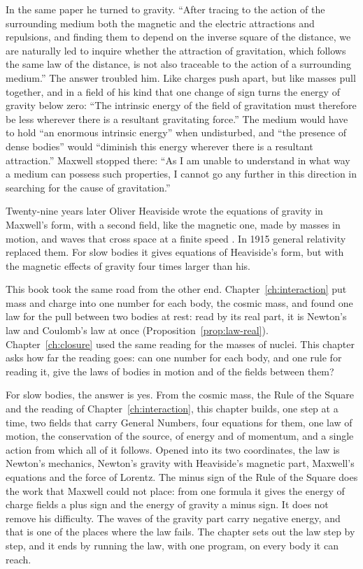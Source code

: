 In the same paper he turned to gravity. \enquote{After tracing to the action of the surrounding medium both the magnetic and the electric attractions and repulsions, and finding them to depend on the inverse square of the distance, we are naturally led to inquire whether the attraction of gravitation, which follows the same law of the distance, is not also traceable to the action of a surrounding medium.} The answer troubled him. Like charges push apart, but like masses pull together, and in a field of his kind that one change of sign turns the energy of gravity below zero: \enquote{The intrinsic energy of the field of gravitation must therefore be less wherever there is a resultant gravitating force.} The medium would have to hold \enquote{an enormous intrinsic energy} when undisturbed, and \enquote{the presence of dense bodies} would \enquote{diminish this energy wherever there is a resultant attraction.} Maxwell stopped there: \enquote{As I am unable to understand in what way a medium can possess such properties, I cannot go any further in this direction in searching for the cause of gravitation.}

Twenty-nine years later Oliver Heaviside wrote the equations of gravity in Maxwell's form, with a second field, like the magnetic one, made by masses in motion, and waves that cross space at a finite speed \citep{Heaviside1893}. In 1915 general relativity replaced them. For slow bodies it gives equations of Heaviside's form, but with the magnetic effects of gravity four times larger than his.

\bigskip

This book took the same road from the other end. Chapter~\ref{ch:interaction} put mass and charge into one number for each body, the cosmic mass, and found one law for the pull between two bodies at rest: read by its real part, it is Newton's law and Coulomb's law at once (Proposition~\ref{prop:law-real}). Chapter~\ref{ch:closure} used the same reading for the masses of nuclei. This chapter asks how far the reading goes: can one number for each body, and one rule for reading it, give the laws of bodies in motion and of the fields between them?

For slow bodies, the answer is yes. From the cosmic mass, the Rule of the Square and the reading of Chapter~\ref{ch:interaction}, this chapter builds, one step at a time, two fields that carry General Numbers, four equations for them, one law of motion, the conservation of the source, of energy and of momentum, and a single action from which all of it follows. Opened into its two coordinates, the law is Newton's mechanics, Newton's gravity with Heaviside's magnetic part, Maxwell's equations and the force of Lorentz. The minus sign of the Rule of the Square does the work that Maxwell could not place: from one formula it gives the energy of charge fields a plus sign and the energy of gravity a minus sign. It does not remove his difficulty. The waves of the gravity part carry negative energy, and that is one of the places where the law fails. The chapter sets out the law step by step, and it ends by running the law, with one program, on every body it can reach.

